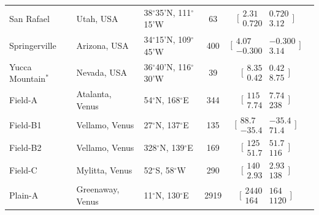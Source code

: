 \documentclass[12pt,letter]{article}
\begin{document}
\begin{table}
\begin{tabular}{p{2cm} p{2.5cm} p{2cm} c c p{4cm}}
San Rafael	&	Utah, USA	&	38$^{\circ}$35'N, 111$^{\circ}$15'W	&	63	&	$\bigl[\begin{smallmatrix} 2.31&0.720\\0.720&3.12 \end{smallmatrix}\bigr]$	&	\citet{kiyosugi2012relationship}\\
Springerville &	Arizona, USA	&	34$^{\circ}$15'N, 109$^{\circ}$45'W	&	400	&	$\bigl[\begin{smallmatrix} 4.07&-0.300\\-0.300&3.14 \end{smallmatrix}\bigr]$	&	\citet{kiyosugi2012relationship,condit2010dynamic}\\
Yucca Mountain$^*$ &	Nevada, USA	&	36$^{\circ}$40'N, 116$^{\circ}$30'W	&	39	&	$\bigl[\begin{smallmatrix} 8.35&0.42\\0.42&8.75 \end{smallmatrix}\bigr]$	&	\citet{kiyosugi2012relationship,connor1995three}\\
Field-A	&	Atalanta, Venus	&	54$^{\circ}$N, 168$^{\circ}$E	&	344	&	$\bigl[\begin{smallmatrix} 115&7.74\\7.74&238 \end{smallmatrix}\bigr]$	&	\citet{miller2012shield}\\
Field-B1	&	Vellamo, Venus	&	27$^{\circ}$N, 137$^{\circ}$E	&	135	&	$\bigl[\begin{smallmatrix} 88.7&-35.4\\-35.4&71.4 \end{smallmatrix}\bigr]$	&	\citet{miller2012shield}\\
Field-B2	&	Vellamo, Venus	&	328$^{\circ}$N, 139$^{\circ}$E	&	169	&	$\bigl[\begin{smallmatrix} 125&51.7\\51.7&116 \end{smallmatrix}\bigr]$	&	\citet{miller2012shield}\\
Field-C	&	Mylitta, Venus	&	52$^{\circ}$S, 58$^{\circ}$W	&	290	&	$\bigl[\begin{smallmatrix} 140&2.93\\2.93&138 \end{smallmatrix}\bigr]$	&	\citet{miller2012shield}\\
Plain-A	&	Greenaway, Venus	&	11$^{\circ}$N, 130$^{\circ}$E	&	2919	&	$\bigl[\begin{smallmatrix} 2440&164\\164&1120 \end{smallmatrix}\bigr]$	&	\citet{miller2012shield}\\

\end{tabular}
\end{table}
\end{document}

